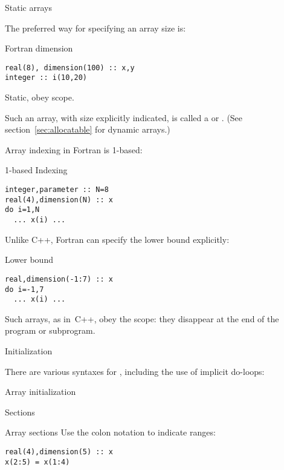 
 {Static arrays}

The preferred way for specifying an array size is:

\begin{block}{Fortran dimension}
  \label{sl:farray-dimension}
\begin{verbatim}
real(8), dimension(100) :: x,y
integer :: i(10,20)
\end{verbatim}
  Static, obey scope.
\end{block}

Such an array, with size explicitly indicated, is called a
 or .
(See section~\ref{sec:allocatable} for
dynamic arrays.)

Array indexing in Fortran is 1-based:
\begin{block}{1-based Indexing}
  \label{sl:farray-base1}
\begin{verbatim}
integer,parameter :: N=8
real(4),dimension(N) :: x
do i=1,N
  ... x(i) ...
\end{verbatim}
\end{block}

Unlike C++, Fortran can specify the lower bound explicitly:
\begin{block}{Lower bound}
  \label{sl:farray-lower}
\begin{verbatim}
real,dimension(-1:7) :: x
do i=-1,7
  ... x(i) ...
\end{verbatim}
\end{block}

Such arrays, as in~C++, obey the scope: they disappear at the end of
the program or subprogram.

 {Initialization}

There are various syntaxes for ,
including the use of implicit do-loops:
\begin{block}{Array initialization}
  \label{sl:farray-init}
\end{block}

 {Sections}

\begin{block}{Array sections}
  \label{sl:farray-section}
  Use the colon notation to indicate ranges:
\begin{verbatim}
real(4),dimension(5) :: x
x(2:5) = x(1:4)
\end{verbatim}
\end{block}

